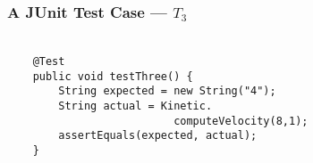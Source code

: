 
\begin{frame}[fragile]
  \frametitle{\vspace*{.5in}A JUnit Test Case --- $T_3$}
  \framesubtitle{}

  \normalsize
  \hspace*{-.65in}
  \begin{minipage}{5in}
    \Large
    \vspace*{-.1in}
    \begin{verbatim}

    @Test
    public void testThree() {
        String expected = new String("4");
        String actual = Kinetic.
                          computeVelocity(8,1);
        assertEquals(expected, actual);
    }

    \end{verbatim}
  \vspace*{.05in}
  \end{minipage}
  \normalsize
  \HUGE



\end{frame}
